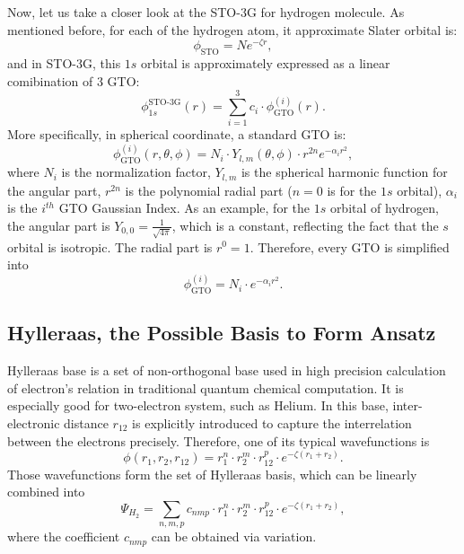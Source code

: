 Now, let us take a closer look at the STO-3G for hydrogen molecule. As mentioned before, for each of the hydrogen atom, it approximate Slater orbital is:
\begin{equation}
    \phi_{\text{STO}}=Ne^{-\zeta r},
\end{equation}
and in STO-3G, this $1s$ orbital is approximately expressed as a linear comibination of 3 GTO:
\begin{equation}
    \phi^{\text{STO-3G}}_{1s}(r)=\sum_{i=1}^3 c_i\cdot\phi^{(i)}_{\text{GTO}}(r).
\end{equation}
More specifically, in spherical coordinate, a standard GTO is:
\begin{equation}
    \phi^{(i)}_{\text{GTO}}(r, \theta, \phi)=N_i\cdot Y_{l,m}(\theta,\phi)\cdot r^{2n}e^{-\alpha_i r^2},
\end{equation}
where $N_i$ is the normalization factor, $Y_{l,m}$ is the spherical harmonic function for the angular part, $r^{2n}$ is the polynomial radial part ($n=0$ is for the $1s$ orbital), $\alpha_i$ is the $i^{th}$ GTO Gaussian Index. As an example, for the $1s$ orbital of hydrogen, the angular part is $Y_{0,0}=\frac{1}{\sqrt{4\pi}}$, which is a constant, reflecting the fact that the $s$ orbital is isotropic. The radial part is $r^0=1$. Therefore, every GTO is simplified into
\begin{equation}
    \phi^{(i)}_{\text{GTO}}=N_i\cdot e^{-\alpha_i r^2}.
\end{equation}

\subsection{Hylleraas, the Possible Basis to Form Ansatz}
Hylleraas base is a set of non-orthogonal base used in high precision calculation of electron's relation in traditional quantum chemical computation. It is especially good for two-electron system, such as Helium. In this base, inter-electronic distance $r_{12}$ is explicitly introduced  to capture the interrelation between the electrons precisely. Therefore, one of its typical wavefunctions is
\begin{equation}
    \phi(r_1, r_2, r_{12})=r_1^n\cdot r^m_2\cdot r_{12}^p\cdot e^{-\zeta(r_1+r_2)}.
\end{equation}
Those wavefunctions form the set of Hylleraas basis, which can be linearly combined into
\begin{equation}
    \Psi_{H_2}=\sum_{n,m,p}c_{nmp}\cdot r^n_1\cdot r^m_2\cdot r_{12}^p\cdot e^{-\zeta(r_1+r_2)},
\end{equation}
where the coefficient $c_{nmp}$ can be obtained via variation.


